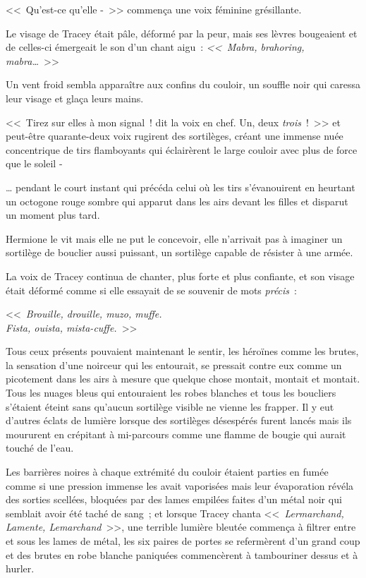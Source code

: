 <<~Qu'est-ce qu'elle -~>> commença une voix féminine grésillante.

Le visage de Tracey était pâle, déformé par la peur, mais ses lèvres bougeaient et de celles-ci émergeait le son d'un chant aigu~: \emph{<<~Mabra, brahoring, mabra…}~>>

Un vent froid sembla apparaître aux confins du couloir, un souffle noir qui caressa leur visage et glaça leurs mains.

<<~Tirez sur elles à mon signal~! dit la voix en chef. Un, deux \emph{trois}~!~>> et peut-être quarante-deux voix rugirent des sortilèges, créant une immense nuée concentrique de tirs flamboyants qui éclairèrent le large couloir avec plus de force que le soleil -

… pendant le court instant qui précéda celui où les tirs s'évanouirent en heurtant un octogone rouge sombre qui apparut dans les airs devant les filles et disparut un moment plus tard.

Hermione le vit mais elle ne put le concevoir, elle n'arrivait pas à imaginer un sortilège de bouclier aussi puissant, un sortilège capable de résister à une armée.

La voix de Tracey continua de chanter, plus forte et plus confiante, et son visage était déformé comme si elle essayait de se souvenir de mots \emph{précis}~:

<<~\emph{Brouille, drouille, muzo, muffe.\\
Fista, ouista, mista-cuffe.}~>>

Tous ceux présents pouvaient maintenant le sentir, les héroïnes comme les brutes, la sensation d'une noirceur qui les entourait, se pressait contre eux comme un picotement dans les airs à mesure que quelque chose montait, montait et montait. Tous les nuages bleus qui entouraient les robes blanches et tous les boucliers s'étaient éteint sans qu'aucun sortilège visible ne vienne les frapper. Il y eut d'autres éclats de lumière lorsque des sortilèges désespérés furent lancés mais ils moururent en crépitant à mi-parcours comme une flamme de bougie qui aurait touché de l'eau.

Les barrières noires à chaque extrémité du couloir étaient parties en fumée comme si une pression immense les avait vaporisées mais leur évaporation révéla des sorties scellées, bloquées par des lames empilées faites d'un métal noir qui semblait avoir été taché de sang~; et lorsque Tracey chanta <<~\emph{Lermarchand, Lamente, Lemarchand}~>>, une terrible lumière bleutée commença à filtrer entre et sous les lames de métal, les six paires de portes se refermèrent d'un grand coup et des brutes en robe blanche paniquées commencèrent à tambouriner dessus et à hurler.

